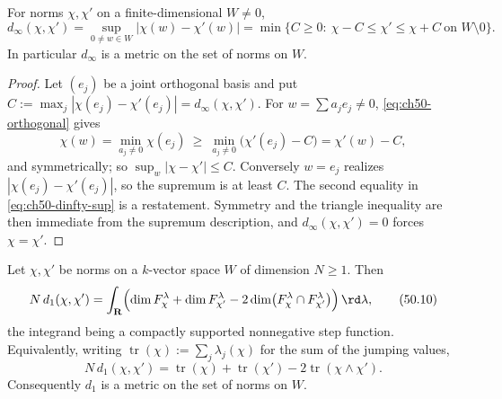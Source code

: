 \begin{proposition}
\label{prop:ch50-dinfty-sup}
For norms $\chi,\chi'$ on a finite-dimensional $W\ne0$,
\[
 d_\infty(\chi,\chi')=\sup_{0\ne w\in W}|\chi(w)-\chi'(w)|
 =\min\{C\ge0:\ \chi-C\le\chi'\le\chi+C\ \text{on }W\setminus0\}.
\tag{50.9}\label{eq:ch50-dinfty-sup}
\]
In particular $d_\infty$ is a metric on the set of norms on $W$.
\end{proposition}

\begin{proof}
Let $(e_j)$ be a joint orthogonal basis and put
$C:=\max_j|\chi(e_j)-\chi'(e_j)|=d_\infty(\chi,\chi')$.  For
$w=\sum a_je_j\ne0$, \eqref{eq:ch50-orthogonal} gives
\[
 \chi(w)=\min_{a_j\ne0}\chi(e_j)
 \ \ge\ \min_{a_j\ne0}\bigl(\chi'(e_j)-C\bigr)=\chi'(w)-C,
\]
and symmetrically; so $\sup_w|\chi-\chi'|\le C$.  Conversely
$w=e_j$ realizes $|\chi(e_j)-\chi'(e_j)|$, so the supremum is at least
$C$.  The second equality in \eqref{eq:ch50-dinfty-sup} is a
restatement.  Symmetry and the triangle inequality are then immediate from
the supremum description, and $d_\infty(\chi,\chi')=0$ forces
$\chi=\chi'$.
\end{proof}

\begin{theorem}
\label{thm:ch50-d1-integral}
Let $\chi,\chi'$ be norms on a $k$-vector space $W$ of dimension
$N\ge1$.  Then
\[
 N\,d_1(\chi,\chi')
 =\int_{\mathbf R}\Bigl(\dim F^\lambda_\chi+\dim F^\lambda_{\chi'}
       -2\dim\bigl(F^\lambda_\chi\cap F^\lambda_{\chi'}\bigr)\Bigr)
   \,\rd\lambda ,
\tag{50.10}\label{eq:ch50-d1-integral}
\]
the integrand being a compactly supported nonnegative step function.
Equivalently, writing $\operatorname{tr}(\chi):=\sum_j\lambda_j(\chi)$ for
the sum of the jumping values,
\[
 N\,d_1(\chi,\chi')
 =\operatorname{tr}(\chi)+\operatorname{tr}(\chi')
   -2\operatorname{tr}(\chi\wedge\chi').
\tag{50.11}\label{eq:ch50-d1-trace}
\]
Consequently $d_1$ is a metric on the set of norms on $W$.
\end{theorem}

